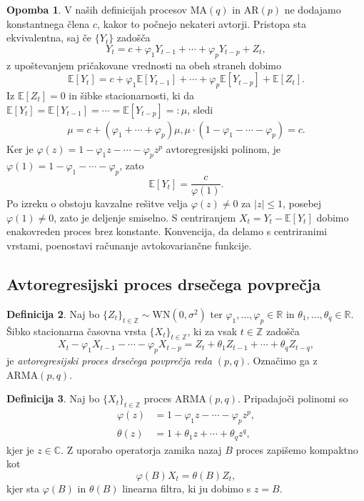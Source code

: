 \documentclass[11pt]{amsart}
\newcommand{\Z}{\mathbb{Z}}
\newcommand{\R}{\mathbb{R}}
\newcommand{\E}{\mathbb{E}}
\newcommand{\WN}{\mathrm{WN}}
\providecommand{\abs}[1]{\left\lvert #1 \right\rvert}
\theoremstyle{definition}
\newtheorem{definicija}{Definicija}[section]
\newtheorem{opomba}[definicija]{Opomba}
\theoremstyle{plain}
\begin{document}
\begin{opomba}
    V naših definicijah procesov $\mathrm{MA}(q)$ in $\mathrm{AR}(p)$ ne dodajamo
    konstantnega člena $c$, kakor to počnejo nekateri avtorji. Pristopa sta ekvivalentna, saj
    če $\{Y_t\}$ zadošča
    \[
        Y_t = c + \varphi_1 Y_{t-1} + \cdots + \varphi_p Y_{t-p} + Z_t,
    \]
    z upoštevanjem pričakovane vrednosti na obeh straneh dobimo
    \[
        \E[Y_t] = c + \varphi_1 \E[Y_{t-1}] + \cdots + \varphi_p \E[Y_{t-p}] + \E[Z_t].
    \]
    Iz $\E[Z_t] = 0$ in šibke stacionarnosti, ki da $\E[Y_t] = \E[Y_{t-1}] = \cdots = \E[Y_{t-p}] =: \mu$, sledi
    \begin{gather*}
        \mu = c + (\varphi_1 + \cdots + \varphi_p) \mu, 
        \mu \cdot (1 - \varphi_1 - \cdots - \varphi_p) = c.
    \end{gather*}
    Ker je $\varphi(z) = 1 - \varphi_1 z - \cdots - \varphi_p z^p$ avtoregresijski polinom, je 
    $\varphi(1) = 1 - \varphi_1 - \cdots - \varphi_p$, zato
    \[
        \E[Y_t] = \frac{c}{\varphi(1)}.
    \]
    Po izreku o obstoju kavzalne rešitve velja $\varphi(z) \neq 0$ za $\abs{z} \leq 1$, posebej 
    $\varphi(1) \neq 0$, zato je deljenje smiselno. S centriranjem $X_t = Y_t - \E[Y_t]$ 
    dobimo enakovreden proces brez konstante. Konvencija, da delamo s centriranimi vrstami, 
    poenostavi računanje avtokovariančne funkcije.
\end{opomba}


\subsection*{Avtoregresijski proces drsečega povprečja}

\begin{definicija}
    Naj bo $\{Z_t\}_{t \in \Z} \sim \WN(0, \sigma^2)$ ter $\varphi_1, \ldots, \varphi_p \in \R$ 
    in $\theta_1, \ldots, \theta_q \in \R$. Šibko stacionarna časovna vrsta $\{X_t\}_{t \in \Z}$, 
    ki za vsak $t \in \Z$ zadošča
    \[
        X_t - \varphi_1 X_{t-1} - \cdots - \varphi_p X_{t-p} 
        = Z_t + \theta_1 Z_{t-1} + \cdots + \theta_q Z_{t-q},
    \]
    je \emph{avtoregresijski proces drsečega povprečja reda $(p,q)$}. Označimo ga z 
    $\mathrm{ARMA}(p,q)$.
\end{definicija}

\begin{definicija}
    Naj bo $\{X_t\}_{t \in \Z}$ proces $\mathrm{ARMA}(p,q)$. Pripadajoči polinomi so
    \begin{align*}
        \varphi(z) &= 1 - \varphi_1 z - \cdots - \varphi_p z^p, \\
        \theta(z)  &= 1 + \theta_1 z + \cdots + \theta_q z^q,
    \end{align*}
    kjer je $z \in \mathbb{C}$. Z uporabo operatorja zamika nazaj $B$ proces zapišemo kompaktno kot
    \[
        \varphi(B) X_t = \theta(B) Z_t,
    \]
    kjer sta $\varphi(B)$ in $\theta(B)$ linearna filtra, ki ju dobimo s $z = B$.
\end{definicija}
\end{document}
